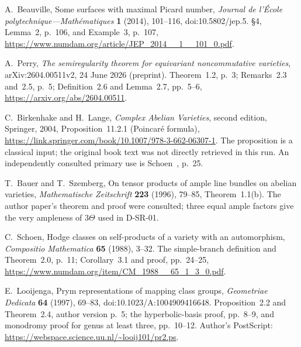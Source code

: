 A.~Beauville,
Some surfaces with maximal Picard number,
\emph{Journal de l'\'Ecole polytechnique---Math\'ematiques}
\textbf{1} (2014), 101--116,
doi:10.5802/jep.5.
\S4, Lemma~2, p.~106, and Example~3, p.~107,
\url{https://www.numdam.org/article/JEP_2014__1__101_0.pdf}.

A.~Perry,
\emph{The semiregularity theorem for equivariant noncommutative varieties},
arXiv:2604.00511v2, 24 June 2026 (preprint).
Theorem~1.2, p.~3; Remarks~2.3 and~2.5, p.~5;
Definition~2.6 and Lemma~2.7, pp.~5--6,
\url{https://arxiv.org/abs/2604.00511}.

C.~Birkenhake and H.~Lange,
\emph{Complex Abelian Varieties}, second edition, Springer, 2004,
Proposition~11.2.1 (Poincar\'e formula),
\url{https://link.springer.com/book/10.1007/978-3-662-06307-1}.
The proposition is a classical input; the original book text was not
directly retrieved in this run. An independently consulted primary use
is Schoen~\cite{SR-Schoen1988}, p.~25.

T.~Bauer and T.~Szemberg,
On tensor products of ample line bundles on abelian varieties,
\emph{Mathematische Zeitschrift} \textbf{223} (1996), 79--85,
Theorem~1.1(b).
The author paper's theorem and proof were consulted; three equal ample
factors give the very ampleness of $3\Theta$ used in D-SR-01.

C.~Schoen,
Hodge classes on self-products of a variety with an automorphism,
\emph{Compositio Mathematica} \textbf{65} (1988), 3--32.
The simple-branch definition and Theorem~2.0, p.~11;
Corollary~3.1 and proof, pp.~24--25,
\url{https://www.numdam.org/item/CM_1988__65_1_3_0.pdf}.

E.~Looijenga,
Prym representations of mapping class groups,
\emph{Geometriae Dedicata} \textbf{64} (1997), 69--83,
doi:10.1023/A:1004909416648.
Proposition~2.2 and Theorem~2.4, author version p.~5;
the hyperbolic-basis proof, pp.~8--9, and monodromy proof for
genus at least three, pp.~10--12.
Author's PostScript: \url{https://webspace.science.uu.nl/~looij101/pr2.ps}.
